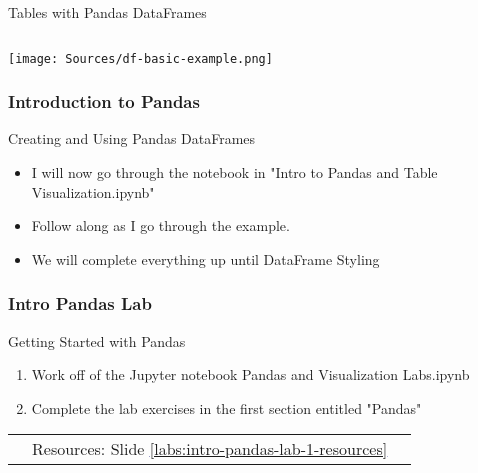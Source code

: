 \documentclass[handout, 11pt]{beamer}
\begin{document}
\begin{section}[Pandas]{Tables with Pandas DataFrames}
\begin{frame}[fragile]
\begin{verbatim}
\end{verbatim}
\texttt{[image: Sources/df-basic-example.png]}
\end{frame}
\begin{frame}
\frametitle{Introduction to Pandas}
{
\begin{block}{Creating and Using Pandas DataFrames}
\begin{itemize}
\item I will now go through the notebook in "Intro to Pandas and Table Visualization.ipynb"
\item Follow along as I go through the example.
\item We will complete everything up until DataFrame Styling
\end{itemize}
\end{block}
}
\end{frame}
\begin{frame}
\frametitle{Intro Pandas Lab}
{
\begin{block}{Getting Started with Pandas}
\begin{enumerate}
\item Work off of the Jupyter notebook Pandas and Visualization Labs.ipynb
\item Complete the lab exercises in the first section entitled "Pandas"
\end{enumerate}
\vfill
\begin{tabular*}{\textwidth}{@{\extracolsep{\fill}}ccc}
\toprule
\hfill & Resources: Slide \textcolor{blue}{\underline{\ref{labs:intro-pandas-lab-1-resources}}} & \hfill\\


\end{tabular*}
\end{block}}
\end{frame}
\end{section}
\end{document}
